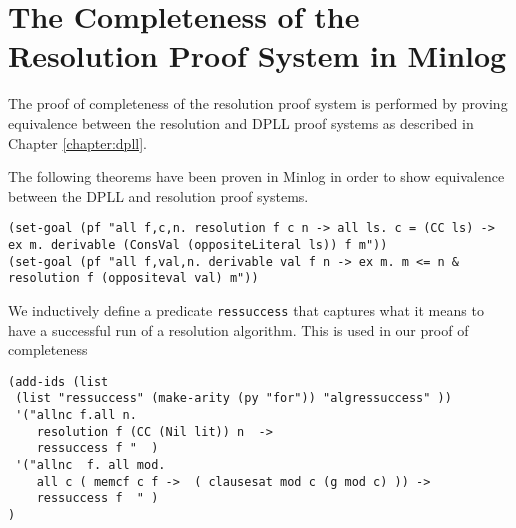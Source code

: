 \section{The Completeness of the Resolution Proof System in Minlog}
The proof of completeness of the resolution proof system is performed by proving equivalence between the resolution and DPLL proof systems as described in Chapter \ref{chapter:dpll}.  
\begin{comment}
\begin{center}
\texttt{(set-goal  (pf "all f,c. all c0,n. resolution f c n  -> (memcf c0 f -> F) -> resolution (conccf c0 f) c n "))}
\end{center}

\begin{center}
\texttt{(set-goal (pf "all f,c. all c0,l0,n.  resolution f c n -> memcf c0 f -> ex m. m <= n +1 \& resolution (conccf(inslc  l0 c0)   (remcf c0 f)) (inslc l0 c) m "))}
\end{center}
\end{comment}

The following theorems have been proven in Minlog in order to show equivalence between the DPLL and resolution proof systems. 
\begin{center}
\texttt{(set-goal (pf "all f,c,n. resolution f c n -> all ls. c = (CC ls) -> ex m.  derivable (ConsVal (oppositeLiteral ls)) f m"))} \\
\texttt{(set-goal (pf "all f,val,n. derivable val f n -> ex m. m <= n \& resolution f (oppositeval val) m"))}
\end{center}

We inductively define a predicate \texttt{ressuccess} that captures what it means to have a successful run of a resolution algorithm. This is used in our proof of completeness 

\begin{lstlisting}[caption = "The Inductive Definition of Resolution Completeness"]
(add-ids (list 
 (list "ressuccess" (make-arity (py "for")) "algressuccess" ))
 '("allnc f.all n.                                                                                                                                           
    resolution f (CC (Nil lit)) n  ->                                                                                                    
    ressuccess f "  )
 '("allnc  f. all mod.                                                                                                                                 
    all c ( memcf c f ->  ( clausesat mod c (g mod c) )) ->                                                                
    ressuccess f  " )
)
\end{lstlisting}




